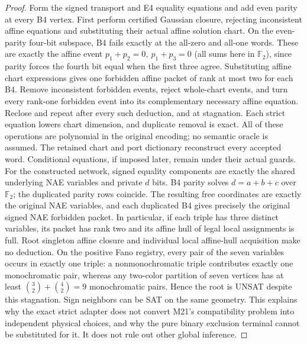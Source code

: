 \documentclass[11pt]{article}
\begin{document}
\begin{proof}
Form the signed transport and E4 equality equations and add even parity at every B4 vertex. First perform certified Gaussian closure, rejecting inconsistent affine equations and substituting their actual affine solution chart. On the even-parity four-bit subspace, B4 fails exactly at the all-zero and all-one words. These are exactly the affine event $p_1+p_2=0,\ p_1+p_3=0$ (all sums here in $\mathbb F_2$), since parity forces the fourth bit equal when the first three agree. Substituting affine chart expressions gives one forbidden affine packet of rank at most two for each B4. Remove inconsistent forbidden events, reject whole-chart events, and turn every rank-one forbidden event into its complementary necessary affine equation. Reclose and repeat after every such deduction, and at stagnation. Each strict equation lowers chart dimension, and duplicate removal is exact. All of these operations are polynomial in the original encoding; no semantic oracle is assumed. The retained chart and port dictionary reconstruct every accepted word. Conditional equations, if imposed later, remain under their actual guards.
For the constructed network, signed equality components are exactly the shared underlying NAE variables and private $d$ bits. B4 parity solves $d=a+b+c$ over $\mathbb F_2$; the duplicated parity rows coincide. The resulting free coordinates are exactly the original NAE variables, and each duplicated B4 gives precisely the original signed NAE forbidden packet. In particular, if each triple has three distinct variables, its packet has rank two and its affine hull of legal local assignments is full. Root singleton affine closure and individual local affine-hull acquisition make no deduction. On the positive Fano registry, every pair of the seven variables occurs in exactly one triple: a nonmonochromatic triple contributes exactly one monochromatic pair, whereas any two-color partition of seven vertices has at least $\binom32+\binom42=9$ monochromatic pairs. Hence the root is UNSAT despite this stagnation. Sign neighbors can be SAT on the same geometry. This explains why the exact strict adapter does not convert M21's compatibility problem into independent physical choices, and why the pure binary exclusion terminal cannot be substituted for it. It does not rule out other global inference.
\end{proof}
\end{document}
